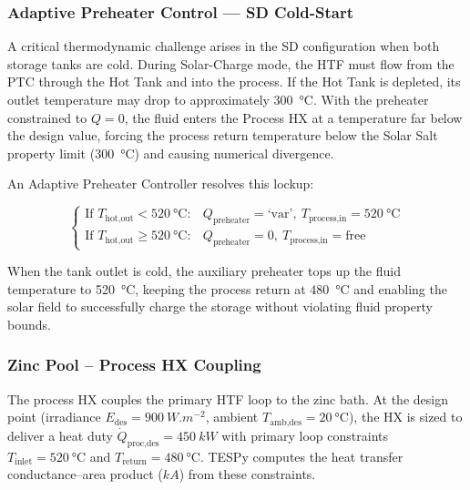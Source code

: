 \documentclass[11pt,review,3p]{elsarticle}
\begin{document}
\subsubsection{Adaptive Preheater Control --- SD Cold-Start}
\label{sec:adaptive_preheater}

A critical thermodynamic challenge arises in the SD configuration when both storage tanks are cold. During Solar-Charge mode, the HTF must flow from the PTC through the Hot Tank and into the process. If the Hot Tank is depleted, its outlet temperature may drop to approximately \SI{300}{\celsius}. With the preheater constrained to $Q=0$, the fluid enters the Process HX at a temperature far below the design value, forcing the process return temperature below the Solar Salt property limit (\SI{300}{\celsius}) and causing numerical divergence.

An Adaptive Preheater Controller resolves this lockup:

\begin{equation}
    \begin{cases}
    \text{If } T_{\text{hot,out}} < \SI{520}{\celsius}: & Q_{\text{preheater}} = \text{`var'}, \ T_{\text{process,in}} = \SI{520}{\celsius} \\[4pt]
    \text{If } T_{\text{hot,out}} \ge \SI{520}{\celsius}: & Q_{\text{preheater}} = 0, \ T_{\text{process,in}} = \text{free}
    \end{cases}
    \label{eq:adaptive_ph}
\end{equation}

When the tank outlet is cold, the auxiliary preheater tops up the fluid temperature to \SI{520}{\celsius}, keeping the process return at \SI{480}{\celsius} and enabling the solar field to successfully charge the storage without violating fluid property bounds.

\subsubsection{Zinc Pool -- Process HX Coupling}
\label{sec:zinc_coupling}

The process HX couples the primary HTF loop to the zinc bath. At the design point (irradiance $E_{\text{des}} = \SI{900}{W.m^{-2}}$, ambient $T_{\text{amb,des}} = \SI{20}{\celsius}$), the HX is sized to deliver a heat duty $\dot{Q}_{\text{proc,des}} = \SI{450}{kW}$ with primary loop constraints $T_{\text{inlet}} = \SI{520}{\celsius}$ and $T_{\text{return}} = \SI{480}{\celsius}$. TESPy computes the heat transfer conductance--area product ($kA$) from these constraints.
\end{document}
